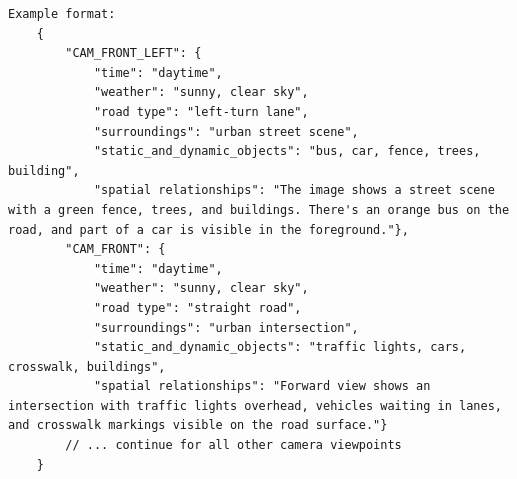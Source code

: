 \begin{lstlisting}[basicstyle=\tiny\ttfamily, breaklines=true, frame=single, numbers=none]
	Example format:
	{
		"CAM_FRONT_LEFT": {
			"time": "daytime",
			"weather": "sunny, clear sky",
			"road type": "left-turn lane",
			"surroundings": "urban street scene",
			"static_and_dynamic_objects": "bus, car, fence, trees, building",
			"spatial relationships": "The image shows a street scene with a green fence, trees, and buildings. There's an orange bus on the road, and part of a car is visible in the foreground."},
		"CAM_FRONT": {
			"time": "daytime",
			"weather": "sunny, clear sky",
			"road type": "straight road",
			"surroundings": "urban intersection",
			"static_and_dynamic_objects": "traffic lights, cars, crosswalk, buildings",
			"spatial relationships": "Forward view shows an intersection with traffic lights overhead, vehicles waiting in lanes, and crosswalk markings visible on the road surface."}
		// ... continue for all other camera viewpoints
	}
\end{lstlisting}
\label{lst:prompt}


